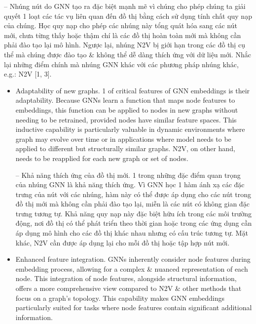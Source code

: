 \documentclass{article}
\begin{document}
\begin{itemize}
\begin{itemize}
\begin{itemize}
           -- Nhúng nút do GNN tạo ra đặc biệt mạnh mẽ vì chúng cho phép chúng ta giải quyết 1 loạt các tác vụ liên quan đến đồ thị bằng cách sử dụng tính chất quy nạp của chúng. Học quy nạp cho phép các nhúng này tổng quát hóa sang các nút mới, chưa từng thấy hoặc thậm chí là các đồ thị hoàn toàn mới mà không cần phải đào tạo lại mô hình. Ngược lại, nhúng N2V bị giới hạn trong các đồ thị cụ thể mà chúng được đào tạo \& không thể dễ dàng thích ứng với dữ liệu mới. Nhắc lại những điểm chính mà nhúng GNN khác với các phương pháp nhúng khác, e.g.: N2V [1, 3].
           \begin{itemize}
               \item {\sf Adaptability of new graphs.} 1 of critical features of GNN embeddings is their adaptability. Because GNNs learn a function that maps node features to embeddings, this function can be applied to nodes in new graphs without needing to be retrained, provided nodes have similar feature spaces. This inductive capability is particularly valuable in dynamic environments where graph may evolve over time or in applications where model needs to be applied to different but structurally similar graphs. N2V, on other hand, needs to be reapplied for each new graph or set of nodes.

               -- {\sf Khả năng thích ứng của đồ thị mới.} 1 trong những đặc điểm quan trọng của nhúng GNN là khả năng thích ứng. Vì GNN học 1 hàm ánh xạ các đặc trưng của nút với các nhúng, hàm này có thể được áp dụng cho các nút trong đồ thị mới mà không cần phải đào tạo lại, miễn là các nút có không gian đặc trưng tương tự. Khả năng quy nạp này đặc biệt hữu ích trong các môi trường động, nơi đồ thị có thể phát triển theo thời gian hoặc trong các ứng dụng cần áp dụng mô hình cho các đồ thị khác nhau nhưng có cấu trúc tương tự. Mặt khác, N2V cần được áp dụng lại cho mỗi đồ thị hoặc tập hợp nút mới.
               \item {\sf Enhanced feature integration.} GNNs inherently consider node features during embedding process, allowing for a complex \& nuanced representation of each node. This integration of node features, alongside structural information, offers a more comprehensive view compared to N2V \& other methods that focus on a graph's topology. This capability makes GNN embeddings particularly suited for tasks where node features contain significant additional information.


\end{itemize}
\end{itemize}
\end{itemize}
\end{itemize}
\end{document}
